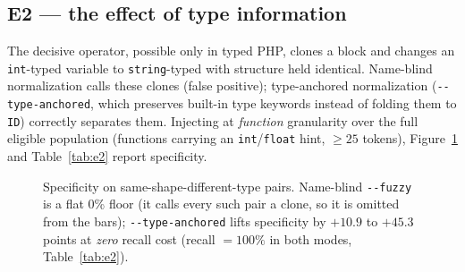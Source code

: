 \documentclass[10pt,a4paper]{article}
\begin{document}
\subsection{E2 --- the effect of type information}
The decisive operator, possible only in typed PHP, clones a block and changes an \texttt{int}-typed
variable to \texttt{string}-typed with structure held identical. Name-blind normalization calls these
clones (false positive); type-anchored normalization (\texttt{-{}-type-anchored}, which preserves
built-in type keywords instead of folding them to \texttt{ID}) correctly separates them. Injecting at
\emph{function} granularity over the full eligible population (functions carrying an
\texttt{int}/\texttt{float} hint, $\ge 25$ tokens), Figure~\ref{fig:lift} and Table~\ref{tab:e2}
report specificity.

\begin{figure}[h]
\centering
{}
\caption{Specificity on same-shape-different-type pairs. Name-blind \texttt{-{}-fuzzy} is a flat 0\%
floor (it calls every such pair a clone, so it is omitted from the bars); \texttt{-{}-type-anchored}
lifts specificity by $+10.9$ to $+45.3$ points at \emph{zero} recall cost (recall $=100\%$ in both
modes, Table~\ref{tab:e2}).}
\label{fig:lift}
\end{figure}
\end{document}
